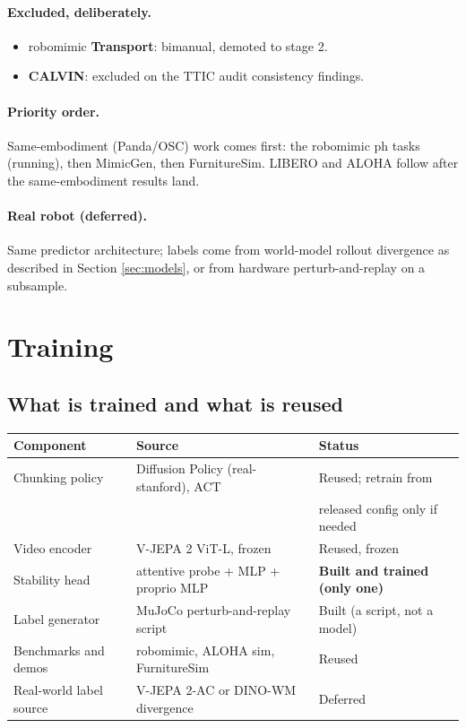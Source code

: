 \documentclass[11pt]{article}
\begin{document}
\paragraph{Excluded, deliberately.}
\begin{itemize}[leftmargin=2em]
  \item robomimic \textbf{Transport}: bimanual, demoted to stage 2.
  \item \textbf{CALVIN}: excluded on the TTIC audit consistency findings.
\end{itemize}

\paragraph{Priority order.} Same-embodiment (Panda/OSC) work comes first: the
robomimic ph tasks (running), then MimicGen, then FurnitureSim. LIBERO and ALOHA
follow after the same-embodiment results land.

\paragraph{Real robot (deferred).} Same predictor architecture; labels come from
world-model rollout divergence as described in Section \ref{sec:models}, or from
hardware perturb-and-replay on a subsample.

\section{Training}
\label{sec:training}

\subsection{What is trained and what is reused}

\begin{center}
\small
\begin{tabular}{@{}lll@{}}
\toprule
Component & Source & Status \\
\midrule
Chunking policy & Diffusion Policy (real-stanford), ACT & Reused; retrain from \\
 & & released config only if needed \\
Video encoder & V-JEPA 2 ViT-L, frozen & Reused, frozen \\
Stability head & attentive probe + MLP + proprio MLP & \textbf{Built and trained (only one)} \\
Label generator & MuJoCo perturb-and-replay script & Built (a script, not a model) \\
Benchmarks and demos & robomimic, ALOHA sim, FurnitureSim & Reused \\
Real-world label source & V-JEPA 2-AC or DINO-WM divergence & Deferred \\
\bottomrule
\end{tabular}
\end{center}
\end{document}
